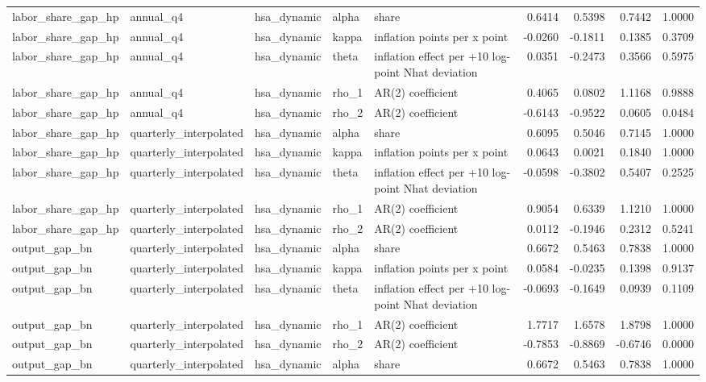 \begin{tabular}{lllllrrrr}
labor\_share\_gap\_hp & annual\_q4 & hsa\_dynamic & alpha & share & 0.6414 & 0.5398 & 0.7442 & 1.0000 \\
labor\_share\_gap\_hp & annual\_q4 & hsa\_dynamic & kappa & inflation points per x point & -0.0260 & -0.1811 & 0.1385 & 0.3709 \\
labor\_share\_gap\_hp & annual\_q4 & hsa\_dynamic & theta & inflation effect per +10 log-point Nhat deviation & 0.0351 & -0.2473 & 0.3566 & 0.5975 \\
labor\_share\_gap\_hp & annual\_q4 & hsa\_dynamic & rho\_1 & AR(2) coefficient & 0.4065 & 0.0802 & 1.1168 & 0.9888 \\
labor\_share\_gap\_hp & annual\_q4 & hsa\_dynamic & rho\_2 & AR(2) coefficient & -0.6143 & -0.9522 & 0.0605 & 0.0484 \\
labor\_share\_gap\_hp & quarterly\_interpolated & hsa\_dynamic & alpha & share & 0.6095 & 0.5046 & 0.7145 & 1.0000 \\
labor\_share\_gap\_hp & quarterly\_interpolated & hsa\_dynamic & kappa & inflation points per x point & 0.0643 & 0.0021 & 0.1840 & 1.0000 \\
labor\_share\_gap\_hp & quarterly\_interpolated & hsa\_dynamic & theta & inflation effect per +10 log-point Nhat deviation & -0.0598 & -0.3802 & 0.5407 & 0.2525 \\
labor\_share\_gap\_hp & quarterly\_interpolated & hsa\_dynamic & rho\_1 & AR(2) coefficient & 0.9054 & 0.6339 & 1.1210 & 1.0000 \\
labor\_share\_gap\_hp & quarterly\_interpolated & hsa\_dynamic & rho\_2 & AR(2) coefficient & 0.0112 & -0.1946 & 0.2312 & 0.5241 \\
output\_gap\_bn & quarterly\_interpolated & hsa\_dynamic & alpha & share & 0.6672 & 0.5463 & 0.7838 & 1.0000 \\
output\_gap\_bn & quarterly\_interpolated & hsa\_dynamic & kappa & inflation points per x point & 0.0584 & -0.0235 & 0.1398 & 0.9137 \\
output\_gap\_bn & quarterly\_interpolated & hsa\_dynamic & theta & inflation effect per +10 log-point Nhat deviation & -0.0693 & -0.1649 & 0.0939 & 0.1109 \\
output\_gap\_bn & quarterly\_interpolated & hsa\_dynamic & rho\_1 & AR(2) coefficient & 1.7717 & 1.6578 & 1.8798 & 1.0000 \\
output\_gap\_bn & quarterly\_interpolated & hsa\_dynamic & rho\_2 & AR(2) coefficient & -0.7853 & -0.8869 & -0.6746 & 0.0000 \\
output\_gap\_bn & quarterly\_interpolated & hsa\_dynamic & alpha & share & 0.6672 & 0.5463 & 0.7838 & 1.0000 \\

\end{tabular}
